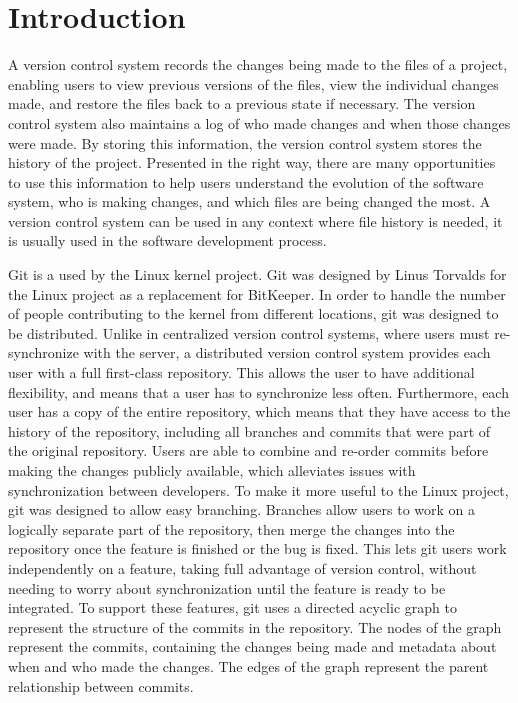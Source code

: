 \chapter{Introduction}

A version control system records the changes being made to the files of
a project,
enabling users to view previous versions of the files,
view the individual changes made,
and restore the files back to a previous state if necessary.
The version control system also maintains a log of who made changes and
when those changes were made.
By storing this information, the version control system stores the
history of the project.
Presented in the right way, there are many opportunities to use
this information to help users understand the evolution of the software
system, who is making changes, and which files are being changed the
most.
A version control system can be used in any context where file history
is needed, it is usually used in the software development process.

Git is a  used by the Linux kernel
project.
Git was designed by Linus Torvalds for the Linux project as a
replacement for BitKeeper.
In order to handle the number of people
contributing to the kernel from different locations, git was designed to
be distributed.
Unlike in centralized version control systems, where users must
re-synchronize with the server, a distributed version control system
provides each user with a full first-class repository. This allows the
user to have additional flexibility, and means that a user has to
synchronize less often.
Furthermore, each user has a copy of the entire
repository, which means that they have access to the history of the
repository, including all branches and commits that were part of the
original repository.
Users are able to combine and re-order commits before making the changes
publicly available, which alleviates issues with synchronization between
developers.
To make it more useful to the Linux project,
git was designed to allow easy branching.
Branches allow users to work on a logically separate part of the
repository, then merge the changes into the repository once the feature
is finished or the bug is fixed.
This lets git users work independently on a feature, taking full
advantage of version control, without needing to worry about
synchronization until the feature is ready to be integrated.
To support these features, git uses a directed acyclic graph to
represent the structure of the commits in the repository.
The nodes of the graph represent the commits, containing the changes
being made and metadata about when and who made the changes.
The edges of the graph represent the parent relationship between
commits.

